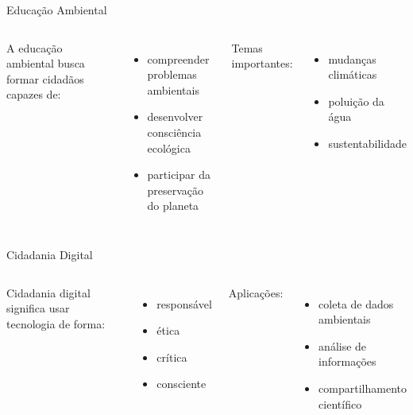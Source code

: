 \documentclass{beamer}
\begin{document}
\begin{frame}{Educação Ambiental}

\begin{columns}


A educação ambiental busca formar cidadãos capazes de:

\begin{itemize}
\item compreender problemas ambientais
\item desenvolver consciência ecológica
\item participar da preservação do planeta
\end{itemize}

Temas importantes:

\begin{itemize}
\item mudanças climáticas
\item poluição da água
\item sustentabilidade
\end{itemize}


\centering
{}

\end{columns}

\end{frame}

\begin{frame}{Cidadania Digital}

\begin{columns}


Cidadania digital significa usar tecnologia de forma:

\begin{itemize}
\item responsável
\item ética
\item crítica
\item consciente
\end{itemize}

Aplicações:

\begin{itemize}
\item coleta de dados ambientais
\item análise de informações
\item compartilhamento científico
\end{itemize}


\centering
{}

\end{columns}

\end{frame}
\end{document}
